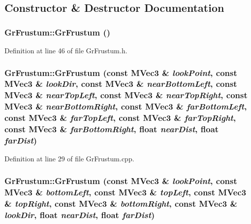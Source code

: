 \begin{CompactItemize}
\subsection{Constructor \& Destructor Documentation}
\hypertarget{class_gr_frustum_41a338ecbcb9de65c9bce33b89b744bf}{
\subsubsection[{GrFrustum}]{\setlength{\rightskip}{0pt plus 5cm}GrFrustum::GrFrustum ()}}
\label{class_gr_frustum_41a338ecbcb9de65c9bce33b89b744bf}




Definition at line 46 of file GrFrustum.h.\hypertarget{class_gr_frustum_4b37b98bc82214e96112a0c058ce8b54}{
\subsubsection[{GrFrustum}]{\setlength{\rightskip}{0pt plus 5cm}GrFrustum::GrFrustum (const {\bf MVec3} \& {\em lookPoint}, \/  const {\bf MVec3} \& {\em lookDir}, \/  const {\bf MVec3} \& {\em nearBottomLeft}, \/  const {\bf MVec3} \& {\em nearTopLeft}, \/  const {\bf MVec3} \& {\em nearTopRight}, \/  const {\bf MVec3} \& {\em nearBottomRight}, \/  const {\bf MVec3} \& {\em farBottomLeft}, \/  const {\bf MVec3} \& {\em farTopLeft}, \/  const {\bf MVec3} \& {\em farTopRight}, \/  const {\bf MVec3} \& {\em farBottomRight}, \/  float {\em nearDist}, \/  float {\em farDist})}}
\label{class_gr_frustum_4b37b98bc82214e96112a0c058ce8b54}




Definition at line 29 of file GrFrustum.cpp.\hypertarget{class_gr_frustum_f2db0fbb9b5c715759d5bd2da6dcb601}{
\subsubsection[{GrFrustum}]{\setlength{\rightskip}{0pt plus 5cm}GrFrustum::GrFrustum (const {\bf MVec3} \& {\em lookPoint}, \/  const {\bf MVec3} \& {\em bottomLeft}, \/  const {\bf MVec3} \& {\em topLeft}, \/  const {\bf MVec3} \& {\em topRight}, \/  const {\bf MVec3} \& {\em bottomRight}, \/  const {\bf MVec3} \& {\em lookDir}, \/  float {\em nearDist}, \/  float {\em farDist})}}
\label{class_gr_frustum_f2db0fbb9b5c715759d5bd2da6dcb601}





\end{CompactItemize}
